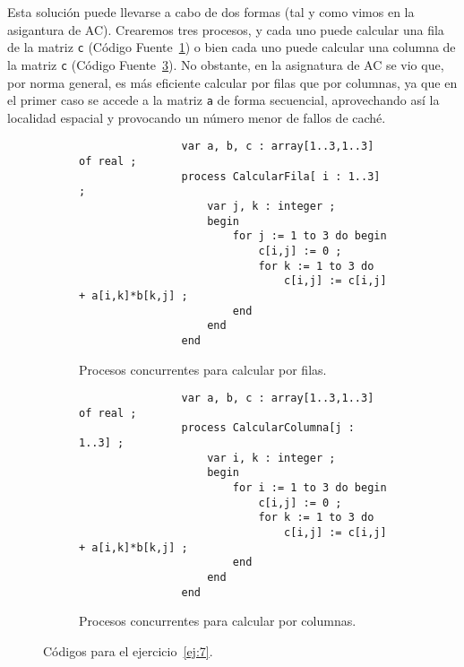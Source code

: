 \begin{ejercicio}
    Esta solución puede llevarse a cabo de dos formas (tal y como vimos en la asigantura de AC). Crearemos tres procesos, y cada uno puede calcular una fila de la matriz \verb|c| (Código Fuente~\ref{code:ej7_fila}) o bien cada uno puede calcular una columna de la matriz \verb|c| (Código Fuente~\ref{code:ej7_columna}). No obstante, en la asignatura de AC se vio que, por norma general, es más eficiente calcular por filas que por columnas, ya que en el primer caso se accede a la matriz \verb|a| de forma secuencial, aprovechando así la localidad espacial y provocando un número menor de fallos de caché.
    \begin{figure}
        \centering
        \begin{subfigure}{0.45\textwidth}
            \centering
            \begin{verbatim}
                var a, b, c : array[1..3,1..3] of real ;
                process CalcularFila[ i : 1..3] ;
                    var j, k : integer ;
                    begin
                        for j := 1 to 3 do begin
                            c[i,j] := 0 ;
                            for k := 1 to 3 do
                                c[i,j] := c[i,j] + a[i,k]*b[k,j] ;
                        end
                    end
                end
            \end{verbatim}
            \caption{Procesos concurrentes para calcular por filas.}
            \label{code:ej7_fila}
        \end{subfigure}\hfill
        \begin{subfigure}{0.45\textwidth}
            \centering
            \begin{verbatim}
                var a, b, c : array[1..3,1..3] of real ;
                process CalcularColumna[j : 1..3] ;
                    var i, k : integer ;
                    begin
                        for i := 1 to 3 do begin
                            c[i,j] := 0 ;
                            for k := 1 to 3 do
                                c[i,j] := c[i,j] + a[i,k]*b[k,j] ;
                        end
                    end
                end
            \end{verbatim}
            \caption{Procesos concurrentes para calcular por columnas.}
            \label{code:ej7_columna}
        \end{subfigure}
        \caption{Códigos para el ejercicio~\ref{ej:7}.}
    \end{figure}
\end{ejercicio}

